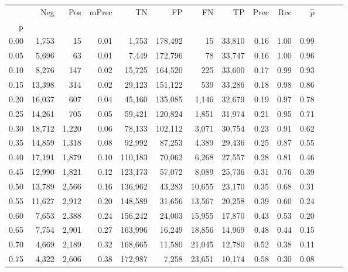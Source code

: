 \begin{tabular}{rrrrrrrrrrrrrr}
\toprule
{} &     Neg &    Pos & mPrec &       TN &       FP &      FN &      TP &  Prec &   Rec & $\hat{p}$ \\
p    &         &        &       &          &          &         &         &       &       &           \\
\midrule
0.00 &   1,753 &     15 &  0.01 &    1,753 &  178,492 &      15 &  33,810 &  0.16 &  1.00 &      0.99 \\
0.05 &   5,696 &     63 &  0.01 &    7,449 &  172,796 &      78 &  33,747 &  0.16 &  1.00 &      0.96 \\
0.10 &   8,276 &    147 &  0.02 &   15,725 &  164,520 &     225 &  33,600 &  0.17 &  0.99 &      0.93 \\
0.15 &  13,398 &    314 &  0.02 &   29,123 &  151,122 &     539 &  33,286 &  0.18 &  0.98 &      0.86 \\
0.20 &  16,037 &    607 &  0.04 &   45,160 &  135,085 &   1,146 &  32,679 &  0.19 &  0.97 &      0.78 \\
0.25 &  14,261 &    705 &  0.05 &   59,421 &  120,824 &   1,851 &  31,974 &  0.21 &  0.95 &      0.71 \\
0.30 &  18,712 &  1,220 &  0.06 &   78,133 &  102,112 &   3,071 &  30,754 &  0.23 &  0.91 &      0.62 \\
0.35 &  14,859 &  1,318 &  0.08 &   92,992 &   87,253 &   4,389 &  29,436 &  0.25 &  0.87 &      0.55 \\
0.40 &  17,191 &  1,879 &  0.10 &  110,183 &   70,062 &   6,268 &  27,557 &  0.28 &  0.81 &      0.46 \\
0.45 &  12,990 &  1,821 &  0.12 &  123,173 &   57,072 &   8,089 &  25,736 &  0.31 &  0.76 &      0.39 \\
0.50 &  13,789 &  2,566 &  0.16 &  136,962 &   43,283 &  10,655 &  23,170 &  0.35 &  0.68 &      0.31 \\
0.55 &  11,627 &  2,912 &  0.20 &  148,589 &   31,656 &  13,567 &  20,258 &  0.39 &  0.60 &      0.24 \\
0.60 &   7,653 &  2,388 &  0.24 &  156,242 &   24,003 &  15,955 &  17,870 &  0.43 &  0.53 &      0.20 \\
0.65 &   7,754 &  2,901 &  0.27 &  163,996 &   16,249 &  18,856 &  14,969 &  0.48 &  0.44 &      0.15 \\
0.70 &   4,669 &  2,189 &  0.32 &  168,665 &   11,580 &  21,045 &  12,780 &  0.52 &  0.38 &      0.11 \\
0.75 &   4,322 &  2,606 &  0.38 &  172,987 &    7,258 &  23,651 &  10,174 &  0.58 &  0.30 &      0.08 \\

\end{tabular}
